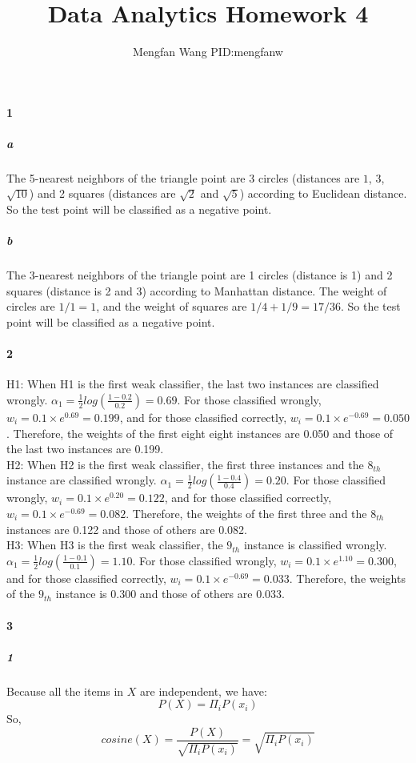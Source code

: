 \documentclass[22pt]{article}
\author{Mengfan Wang PID:mengfanw}
\title{Data Analytics Homework 4}
\begin{document}
	\maketitle 
	\paragraph{1}
		\subparagraph{a} The 5-nearest neighbors of the triangle point are 3 circles (distances are $1$, $3$, $\sqrt{10}$) and 2 squares (distances are $\sqrt{2}$ and $\sqrt{5}$) according to Euclidean distance. So the test point will be classified as a negative point.

		\subparagraph{b} The 3-nearest neighbors of the triangle point are 1 circles (distance is 1) and 2 squares (distance is 2 and 3) according to Manhattan distance. The weight of circles are $1/1 = 1$, and the weight of squares are $1/4+ 1/9 = 17/36$. So the test point will be classified as a negative point.

	\paragraph{2} H1: When H1 is the first weak classifier, the last two instances are classified wrongly. $\alpha_1 = \frac{1}{2}log(\frac{1-0.2}{0.2}) = 0.69$. For those classified wrongly, $w_i = 0.1\times e^{0.69}=0.199$, and for those classified correctly, $w_i = 0.1\times e^{-0.69}=0.050$. Therefore, the weights of the first eight eight instances are 0.050 and those of the last two instances are 0.199.\\[1ex]
	H2: When H2 is the first weak classifier, the first three instances and the $8_{th}$ instance are classified wrongly. $\alpha_1 =  \frac{1}{2}log(\frac{1-0.4}{0.4}) = 0.20$. For those classified wrongly, $w_i = 0.1\times e^{0.20}=0.122$, and for those classified correctly, $w_i = 0.1\times e^{-0.69}=0.082$. Therefore, the weights of the first three and the $8_{th}$ instances are 0.122 and those of others are 0.082.\\[1ex]
	H3: When H3 is the first weak classifier, the $9_{th}$ instance is classified wrongly. $\alpha_1 =  \frac{1}{2}log(\frac{1-0.1}{0.1}) = 1.10$. For those classified wrongly, $w_i = 0.1\times e^{1.10}=0.300$, and for those classified correctly, $w_i = 0.1\times e^{-0.69}=0.033$. Therefore, the weights of the $9_{th}$ instance is 0.300 and those of others are 0.033.  

	\paragraph{3}
		\subparagraph{1} Because all the items in $X$ are independent, we have:
		\begin{equation}
			P(X) = \Pi_iP(x_i)
		\end{equation}
		So,
		\begin{equation}
			cosine(X) = \frac{P(X)}{\sqrt{\Pi_iP(x_i)}} = \sqrt{\Pi_iP(x_i)}
		\end{equation}
\end{document}

